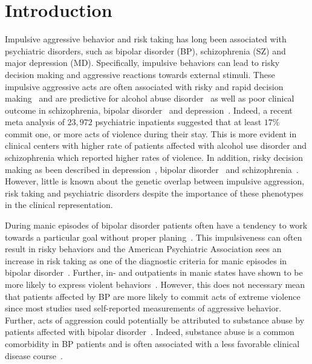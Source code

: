 \section{Introduction}
\label{sec:introduction}

Impulsive aggressive behavior and risk taking has long been associated with psychiatric disorders, such as bipolar disorder (BP), schizophrenia (SZ) and major depression (MD).
Specifically, impulsive behaviors can lead to risky decision making and aggressive reactions towards external stimuli.  
These impulsive aggressive acts are often associated with risky and rapid decision making~\cite{Moeller2001} and are predictive for alcohol abuse disorder~\cite{Courtney2012} as well as poor clinical outcome in schizophrenia, bipolar disorder~\cite{Gut-Fayand2001} and depression~\cite{Dutton2013}.
Indeed, a recent meta analysis of $23,972$ psychiatric inpatients suggested that at least $17\%$ commit one, or more acts of violence during their stay.
This is more evident in clinical centers with higher rate of patients affected with alcohol use disorder and schizophrenia which reported higher rates of violence. 
In addition, risky decision making as been described in depression~\cite{Wilson2010}, bipolar disorder~\cite{Johnson2012} and schizophrenia~\cite{Cheng2012}.
However, little is known about the genetic overlap between impulsive aggression, risk taking and psychiatric disorders despite the importance of these phenotypes in the clinical representation.

During manic episodes of bipolar disorder patients often have a tendency to work towards a particular goal without proper planing~\cite{Johnson2012}.
This impulsiveness can often result in risky behaviors and the American Psychiatric Association sees an increase in risk taking as one of the diagnostic criteria for manic episodes in bipolar disorder~\cite{APA1994,AmericanPsychiatricAssociation2013}.
Further, in- and outpatients in manic states have shown to be more likely to express violent behaviors~\cite{Ballester2012}.
However, this does not necessary mean that patients affected by BP are more likely to commit acts of extreme violence since most studies used self-reported measurements of aggressive behavior.
Further, acts of aggression could potentially be attributed to substance abuse by patients affected with bipolar disorder~\cite{Fazel2010}.
Indeed, substance abuse is a common comorbidity in BP patients and is often associated with a less favorable clinical disease course~\cite{Cassidy2001}.

